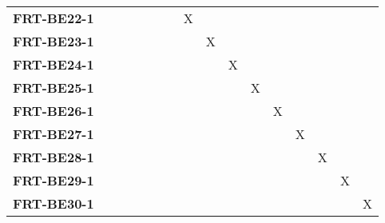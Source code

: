 \documentclass[12pt, titlepage]{article}
\begin{document}
\begin{landscape}
\begin{longtable}{|l|ccccccccccccc|}
		\textbf{FRT-BE22-1} & ~                                                         & ~             & ~             & ~             & X             & ~             & ~             & ~             & ~             & ~             & ~             & ~             & ~             \\
		\textbf{FRT-BE23-1} & ~                                                         & ~             & ~             & ~             & ~             & X             & ~             & ~             & ~             & ~             & ~             & ~             & ~             \\
		\textbf{FRT-BE24-1} & ~                                                         & ~             & ~             & ~             & ~             & ~             & X             & ~             & ~             & ~             & ~             & ~             & ~             \\
		\textbf{FRT-BE25-1} & ~                                                         & ~             & ~             & ~             & ~             & ~             & ~             & X             & ~             & ~             & ~             & ~             & ~             \\
		\textbf{FRT-BE26-1} & ~                                                         & ~             & ~             & ~             & ~             & ~             & ~             & ~             & X             & ~             & ~             & ~             & ~             \\
		\textbf{FRT-BE27-1} & ~                                                         & ~             & ~             & ~             & ~             & ~             & ~             & ~             & ~             & X             & ~             & ~             & ~             \\
		\textbf{FRT-BE28-1} & ~                                                         & ~             & ~             & ~             & ~             & ~             & ~             & ~             & ~             & ~             & X             & ~             & ~             \\
		\textbf{FRT-BE29-1} & ~                                                         & ~             & ~             & ~             & ~             & ~             & ~             & ~             & ~             & ~             & ~             & X             & ~             \\
		\textbf{FRT-BE30-1} & ~                                                         & ~             & ~             & ~             & ~             & ~             & ~             & ~             & ~             & ~             & ~             & ~             & X             \\
		\hline
	\end{longtable}


\end{landscape}
\end{document}
